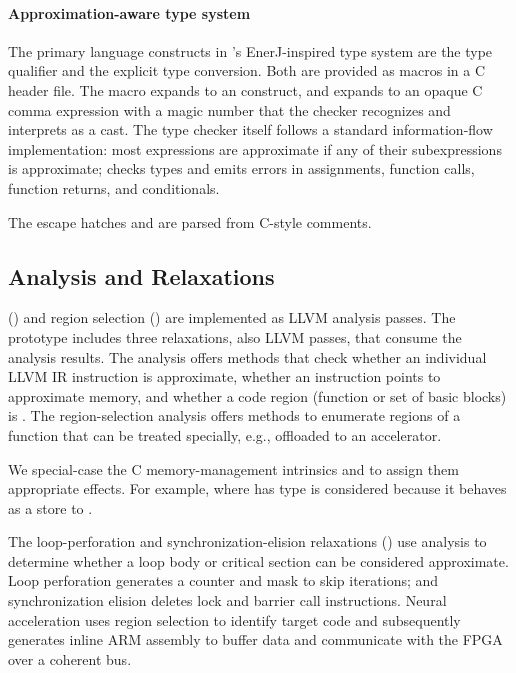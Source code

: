 \paragraph{Approximation-aware type system}

The primary language constructs in \sysname's EnerJ-inspired type system
are the  type qualifier and the  explicit type
conversion. Both are provided as macros in a C header file. The
 macro expands to an  construct,
and  expands to an opaque C comma expression with a magic
number that the checker recognizes and interprets as a cast.
The type checker itself follows a standard information-flow implementation:
most expressions are approximate if any of their subexpressions is
approximate; \sysname checks types and emits errors in assignments, function
calls, function returns, and conditionals.

The escape hatches \annpermit and \annforbid are parsed from
C-style comments.

\subsection{Analysis and Relaxations}

\Precisepurity () and region selection
() are implemented as LLVM analysis passes. The \sysname
prototype includes three relaxations, also LLVM passes, that
consume the analysis results.
%
The \precisepurity analysis offers methods that check whether an individual LLVM
IR instruction is approximate, whether an instruction points to approximate
memory, and whether a code region (function or set of basic blocks) is \precisepure.
%
The region-selection analysis offers methods to enumerate \precisepure regions
of a function that can be treated specially, e.g., offloaded to an accelerator.

We special-case
the C memory-management intrinsics  and 
to assign them appropriate effects.
For example,  where  has type
 is
considered \precisepure because it behaves as a store to .

The loop-perforation and synchronization-elision relaxations
() use \precisepurity analysis to determine whether
a loop body or critical section can be considered approximate.
Loop perforation generates a counter and mask to skip iterations;
and synchronization elision deletes lock and barrier call instructions.
Neural acceleration uses region selection to identify target code and
subsequently generates inline ARM assembly to buffer data and communicate
with the FPGA over a coherent bus.

